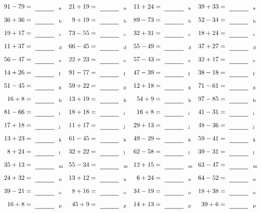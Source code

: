 \documentclass
[
  draft    = true,
  fontsize = 11pt,
  parskip  = half-
]
{scrartcl}
\begin{document}
\clearpage
\begin{align*}
    \pline{91-79}&=\rline{a}
  & \pline{21+19}&=\rline{a}
  & \pline{11+24}&=\rline{a}
  & \pline{39+33}&=\rline{a} \\[1ex]
    \pline{36+36}&=\rline{b}
  & \pline{9+19}&=\rline{b}
  & \pline{89-73}&=\rline{b}
  & \pline{52-34}&=\rline{b} \\[1ex]
    \pline{19+17}&=\rline{c}
  & \pline{73-55}&=\rline{c}
  & \pline{32+31}&=\rline{c}
  & \pline{18+24}&=\rline{c} \\[1ex]
    \pline{11+37}&=\rline{d}
  & \pline{66-45}&=\rline{d}
  & \pline{55-49}&=\rline{d}
  & \pline{37+27}&=\rline{d} \\[1ex]
    \pline{56-47}&=\rline{e}
  & \pline{22+23}&=\rline{e}
  & \pline{57-43}&=\rline{e}
  & \pline{32+17}&=\rline{e} \\[1ex]
    \pline{14+26}&=\rline{f}
  & \pline{91-77}&=\rline{f}
  & \pline{47-39}&=\rline{f}
  & \pline{38-18}&=\rline{f} \\[1ex]
    \pline{51-45}&=\rline{g}
  & \pline{59+22}&=\rline{g}
  & \pline{12+18}&=\rline{g}
  & \pline{71-61}&=\rline{g} \\[1ex]
    \pline{16+8}&=\rline{h}
  & \pline{13+19}&=\rline{h}
  & \pline{54+9}&=\rline{h}
  & \pline{97-85}&=\rline{h} \\[1ex]
    \pline{81-66}&=\rline{i}
  & \pline{18+18}&=\rline{i}
  & \pline{16+8}&=\rline{i}
  & \pline{41-31}&=\rline{i} \\[1ex]
    \pline{17+18}&=\rline{j}
  & \pline{11+17}&=\rline{j}
  & \pline{29+13}&=\rline{j}
  & \pline{48-36}&=\rline{j} \\[1ex]
    \pline{13+23}&=\rline{k}
  & \pline{61-45}&=\rline{k}
  & \pline{49-29}&=\rline{k}
  & \pline{59-41}&=\rline{k} \\[1ex]
    \pline{8+24}&=\rline{l}
  & \pline{32+22}&=\rline{l}
  & \pline{62-58}&=\rline{l}
  & \pline{39-31}&=\rline{l} \\[1ex]
    \pline{35+13}&=\rline{m}
  & \pline{55-34}&=\rline{m}
  & \pline{12+15}&=\rline{m}
  & \pline{63-47}&=\rline{m} \\[1ex]
    \pline{24+32}&=\rline{n}
  & \pline{13+12}&=\rline{n}
  & \pline{6+24}&=\rline{n}
  & \pline{64-52}&=\rline{n} \\[1ex]
    \pline{39-21}&=\rline{o}
  & \pline{8+16}&=\rline{o}
  & \pline{34-19}&=\rline{o}
  & \pline{18+38}&=\rline{o} \\[1ex]
    \pline{16+8}&=\rline{p}
  & \pline{45+9}&=\rline{p}
  & \pline{14+13}&=\rline{p}
  & \pline{39+6}&=\rline{p}
\end{align*}
\end{document}

